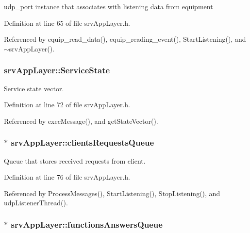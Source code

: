 udp\_\-port instance that associates with listening data from equipment 



Definition at line 65 of file srvAppLayer.h.



Referenced by equip\_\-read\_\-data(), equip\_\-reading\_\-event(), StartListening(), and $\sim$srvAppLayer().

\hypertarget{classsrvAppLayer_ad6ecca4186d37afcf4c94617fa66a990}{
\subsubsection[{ServiceState}]{ {\bf srvAppLayer::ServiceState}}}
\label{d8/d72/classsrvAppLayer_ad6ecca4186d37afcf4c94617fa66a990}


Service state vector. 



Definition at line 72 of file srvAppLayer.h.



Referenced by execMessage(), and getStateVector().

\hypertarget{classsrvAppLayer_a79e7499e8647eb0f0ba4fd9613fd48c0}{
\subsubsection[{clientsRequestsQueue}]{$\ast$ {\bf srvAppLayer::clientsRequestsQueue}}}
\label{d8/d72/classsrvAppLayer_a79e7499e8647eb0f0ba4fd9613fd48c0}


Queue that stores received requests from client. 



Definition at line 76 of file srvAppLayer.h.



Referenced by ProcessMessages(), StartListening(), StopListening(), and udpListenerThread().

\hypertarget{classsrvAppLayer_a6c6ddd6197dc92d2812ed3de418e4b5e}{
\subsubsection[{functionsAnswersQueue}]{$\ast$ {\bf srvAppLayer::functionsAnswersQueue}}}
\label{d8/d72/classsrvAppLayer_a6c6ddd6197dc92d2812ed3de418e4b5e}


